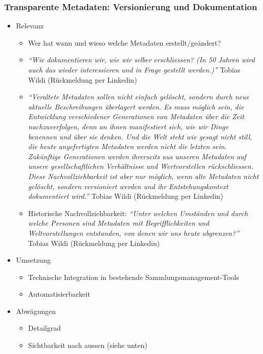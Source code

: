 \documentclass[
  letterpaper,
  DIV=11,
  numbers=noendperiod]{scrartcl}
\providecommand{\tightlist}{%
  \setlength{\itemsep}{0pt}\setlength{\parskip}{0pt}}\usepackage{longtable,booktabs,array}
\begin{document}
\subsubsection{Transparente Metadaten: Versionierung und
Dokumentation}\label{transparente-metadaten-versionierung-und-dokumentation}

\begin{itemize}
\tightlist
\item
  Relevanz

  \begin{itemize}
  \tightlist
  \item
    Wer hat wann und wieso welche Metadaten erstellt/geändert?
  \item
    \emph{``Wie dokumentieren wir, wie wir selber erschliessen? (In 50
    Jahren wird auch das wieder interessieren und in Frage gestellt
    werden.)''} Tobias Wildi (Rückmeldung per Linkedin)
  \item
    \emph{``Veraltete Metadaten sollen nicht einfach gelöscht, sondern
    durch neue aktuelle Beschreibungen überlagert werden. Es muss
    möglich sein, die Entwicklung verschiedener Generationen von
    Metadaten über die Zeit nachzuverfolgen, denn an ihnen manifestiert
    sich, wie wir Dinge benennen und über sie denken. Und die Welt steht
    wie gesagt nicht still, die heute angefertigten Metadaten werden
    nicht die letzten sein. Zukünftige Generationen werden ihrerseits
    aus unseren Metadaten auf unsere gesellschaftlichen Verhältnisse und
    Wertvorstellen rückschliessen. Diese Nachvollziehbarkeit ist aber
    nur möglich, wenn alte Metadaten nicht gelöscht, sondern versioniert
    werden und ihr Entstehungskontext dokumentiert wird.''} Tobias Wildi
    (Rückmeldung per Linkedin)
  \item
    Historische Nachvollziehbarkeit: \emph{``Unter welchen Umständen und
    durch welche Personen sind Metadaten mit Begrifflichkeiten und
    Weltvorstellungen entstanden, von denen wir uns heute abgrenzen?''}
    Tobias Wildi (Rückmeldung per Linkedin)
  \end{itemize}
\item
  Umsetzung

  \begin{itemize}
  \tightlist
  \item
    Technische Integration in bestehende Sammlungsmanagement-Tools
  \item
    Automatisierbarkeit
  \end{itemize}
\item
  Abwägungen

  \begin{itemize}
  \tightlist
  \item
    Detailgrad
  \item
    Sichtbarkeit nach aussen (siehe unten)
  \end{itemize}
\end{itemize}
\end{document}
